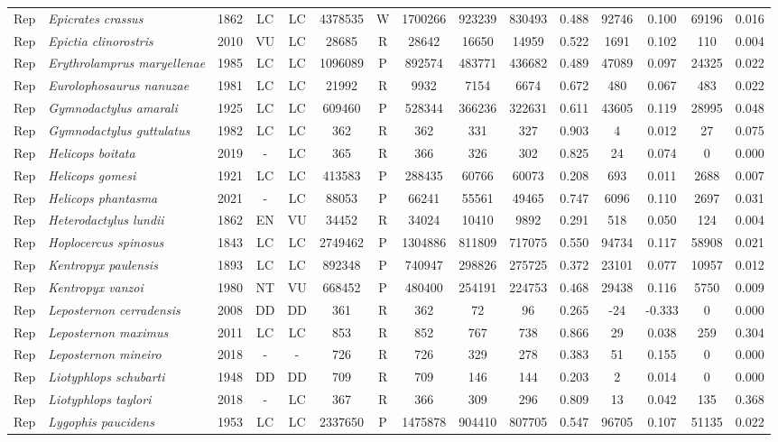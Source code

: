 \documentclass[12pt,openright,oneside,a4paper,english]{abntex2}
\begin{document}
\begin{landscape}
\begin{longtable}{llccccccccccccc}
		Rep&\textit{Epicrates crassus}&1862&LC&LC&4378535&W&1700266&923239&830493&0.488&92746&0.100&69196&0.016\\
		Rep&\textit{Epictia clinorostris}&2010&VU&LC&28685&R&28642&16650&14959&0.522&1691&0.102&110&0.004\\
		Rep&\textit{Erythrolamprus maryellenae}&1985&LC&LC&1096089&P&892574&483771&436682&0.489&47089&0.097&24325&0.022\\
		Rep&\textit{Eurolophosaurus nanuzae}&1981&LC&LC&21992&R&9932&7154&6674&0.672&480&0.067&483&0.022\\
		Rep&\textit{Gymnodactylus amarali}&1925&LC&LC&609460&P&528344&366236&322631&0.611&43605&0.119&28995&0.048\\
		Rep&\textit{Gymnodactylus guttulatus}&1982&LC&LC&362&R&362&331&327&0.903&4&0.012&27&0.075\\
		Rep&\textit{Helicops boitata}&2019&-&LC&365&R&366&326&302&0.825&24&0.074&0&0.000\\
		Rep&\textit{Helicops gomesi}&1921&LC&LC&413583&P&288435&60766&60073&0.208&693&0.011&2688&0.007\\
		Rep&\textit{Helicops phantasma}&2021&-&LC&88053&P&66241&55561&49465&0.747&6096&0.110&2697&0.031\\
		Rep&\textit{Heterodactylus lundii}&1862&EN&VU&34452&R&34024&10410&9892&0.291&518&0.050&124&0.004\\
		Rep&\textit{Hoplocercus spinosus}&1843&LC&LC&2749462&P&1304886&811809&717075&0.550&94734&0.117&58908&0.021\\
		Rep&\textit{Kentropyx paulensis}&1893&LC&LC&892348&P&740947&298826&275725&0.372&23101&0.077&10957&0.012\\
		Rep&\textit{Kentropyx vanzoi}&1980&NT&VU&668452&P&480400&254191&224753&0.468&29438&0.116&5750&0.009\\
		Rep&\textit{Leposternon cerradensis}&2008&DD&DD&361&R&362&72&96&0.265&-24&-0.333&0&0.000\\
		Rep&\textit{Leposternon maximus}&2011&LC&LC&853&R&852&767&738&0.866&29&0.038&259&0.304\\
		Rep&\textit{Leposternon mineiro}&2018&-&-&726&R&726&329&278&0.383&51&0.155&0&0.000\\
		Rep&\textit{Liotyphlops schubarti}&1948&DD&DD&709&R&709&146&144&0.203&2&0.014&0&0.000\\
		Rep&\textit{Liotyphlops taylori}&2018&-&LC&367&R&366&309&296&0.809&13&0.042&135&0.368\\
		Rep&\textit{Lygophis paucidens}&1953&LC&LC&2337650&P&1475878&904410&807705&0.547&96705&0.107&51135&0.022\\

\end{longtable}
\end{landscape}
\end{document}
